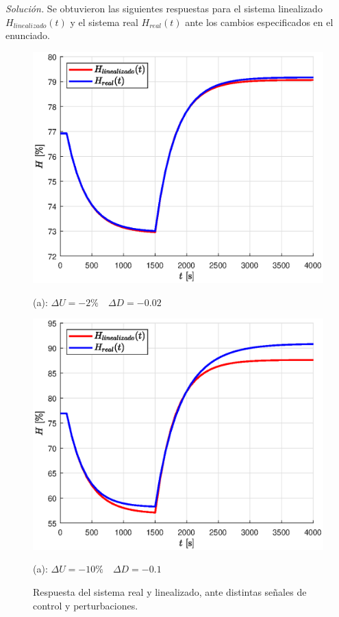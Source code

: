 \textit{Solución.} Se obtuvieron las siguientes respuestas para el sistema linealizado $H _{linealizado}(t)$ y el sistema real $H _{real}(t)$ ante los cambios especificados en el enunciado.

\begin{figure}[!h]
    \centering
    \begin{minipage}{0.5\linewidth}
        \centering
        \includegraphics[width = 0.8\linewidth]{figs/fig4.eps}
        \caption*{(a): $\Delta U = -2\% \quad \Delta D = -0.02$}
    \end{minipage}%
    \begin{minipage}{0.5\linewidth}
        \centering
        \includegraphics[width = 0.8\linewidth]{figs/fig5.eps}
        \caption*{(a): $\Delta U = -10\% \quad \Delta D = -0.1$}
    \end{minipage}
    \caption{Respuesta del sistema real y linealizado, ante distintas señales de control y perturbaciones.}
    \label{fig4}
\end{figure}
\newpage
